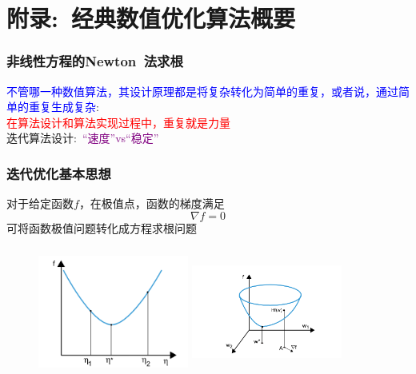 \section{附录:~经典数值优化算法概要}
\frame
{
	\frametitle{非线性方程的\textrm{Newton~}法求根}
	\textcolor{blue}{不管哪一种数值算法，其设计原理都是将复杂转化为简单的重复，或者说，通过简单的重复生成复杂}:\\
	\textcolor{red}{在算法设计和算法实现过程中，重复就是力量}\\
迭代算法设计:~\textcolor{purple}{“速度”\textrm{vs}“稳定”}
\begin{figure}[h!]
\centering
{}
\label{Equation_Newon}
\end{figure}
}

\frame
{
	\frametitle{迭代优化基本思想}
	对于给定函数$f$，在极值点，函数的梯度满足
	\begin{displaymath}
		\nabla f=0
	\end{displaymath}
	可将函数极值问题转化成方程求根问题
\begin{figure}[h!]
\centering
\includegraphics[height=1.68in,width=1.95in,viewport=30 0 450 360,clip]{Figures/OP_mini-1.png}
\hskip 0.05in
\includegraphics[height=1.68in,width=1.95in,viewport=150 20 560 390,clip]{Figures/OP_mini-2.png}
\label{OP_mini}
\end{figure}
}

